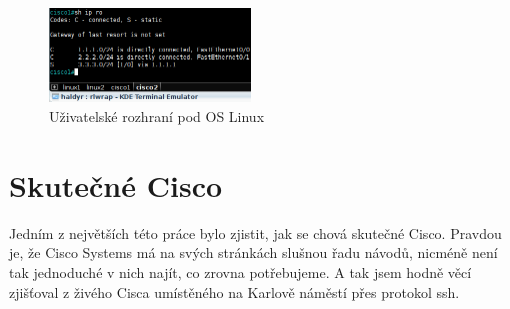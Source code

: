 \begin{figure}[h]
\begin{center}
\includegraphics[height=2.5cm]{figures/uziv_rozhrani}
\caption{Uživatelské rozhraní pod OS Linux}
\label{fig:uziv_rozh}
\end{center}
\end{figure}

\section{Skutečné Cisco}
Jedním z největších  této práce bylo zjistit, jak se chová skutečné Cisco. Pravdou je, že Cisco Systems má na svých stránkách slušnou řadu návodů, nicméně není tak jednoduché v nich najít, co zrovna potřebujeme. A tak jsem hodně věcí zjišťoval z živého Cisca umístěného na Karlově náměstí přes protokol ssh. 








